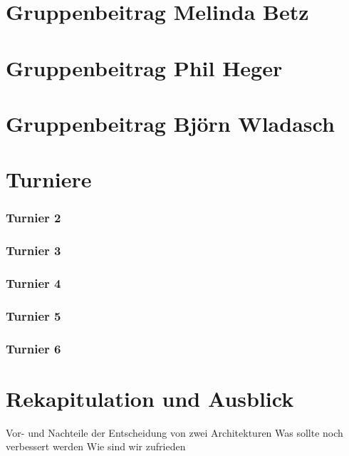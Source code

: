 \documentclass[runningheads]{llncs}
\begin{document}
\section{Gruppenbeitrag Melinda Betz}

\section{Gruppenbeitrag Phil Heger}

\section{Gruppenbeitrag Björn Wladasch}

\section{Turniere}
\subsubsection{Turnier 2}
\subsubsection{Turnier 3}
\subsubsection{Turnier 4}
\subsubsection{Turnier 5}
\subsubsection{Turnier 6}

\section{Rekapitulation und Ausblick}
Vor- und Nachteile der Entscheidung von zwei Architekturen
Was sollte noch verbessert werden
Wie sind wir zufrieden
\end{document}

